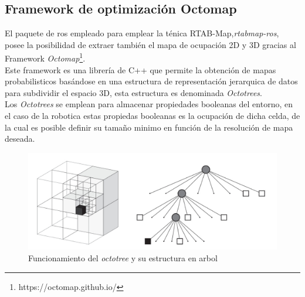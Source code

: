 \subsection{Framework de optimización Octomap}
El paquete de ros empleado para emplear la ténica RTAB-Map,\textit{rtabmap-ros}, posee la posibilidad de extraer también el mapa de ocupación 2D y 3D gracias al Framework 
\textit{Octomap}\footnote{https://octomap.github.io/}. \\
Este framework es una librería de C++ que permite la obtención de mapas probabilisticos basándose en una estructura de representación jerarquica de datos para subdividir
el espacio 3D, esta estructura es denominada \textit{Octotrees}. \\

Los \textit{Octotrees} se emplean para almacenar propiedades booleanas del entorno, en el caso de
la robotica estas propiedas booleanas es la ocupación de dicha celda, de la cual es posible definir su tamaño minimo en función de la resolución de mapa
deseada.
\begin{figure}[h!]
    \centering
    \includegraphics[width=.7\textwidth]{images/octotree}
    \caption{Funcionamiento del \textit{octotree} y su estructura en arbol}
\end{figure}

